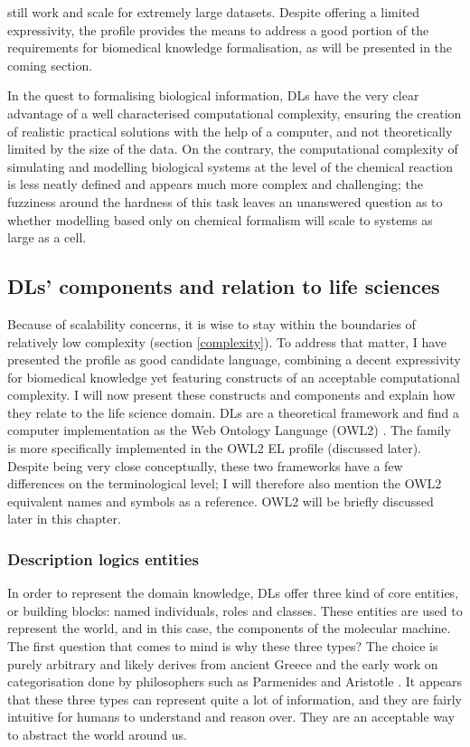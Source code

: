 still work and scale for extremely large datasets. Despite offering a limited expressivity, the  profile provides the means to address a good portion of the requirements for biomedical knowledge formalisation, as will be presented in the coming section.

In the quest to formalising biological information, DLs have the very clear advantage of a well characterised computational complexity, ensuring the creation of realistic practical solutions with the help of a computer, and not theoretically limited by the size of the data. On the contrary, the computational complexity of simulating and modelling biological systems at the level of the chemical reaction is less neatly defined \citep{meng2004modeling} \citep{gillespie2007stochastic} and appears much more complex and challenging; the fuzziness around the hardness of this task leaves an unanswered question as to whether modelling based only on chemical formalism will scale to systems as large as a cell.

\subsection{DLs' components and relation to life sciences}

Because of scalability concerns, it is wise to stay within the boundaries of relatively low complexity (section \ref{complexity}). To address that matter, I have presented the  profile as good candidate language, combining a decent expressivity for biomedical knowledge yet featuring constructs of an acceptable computational complexity. I will now present these constructs and components and explain how they relate to the life science domain. DLs are a theoretical framework and find a computer implementation as the Web Ontology Language (OWL2) \citep{owlw3c}. The  family is more specifically implemented in the OWL2 EL profile (discussed later).
Despite being very close conceptually, these two frameworks have a few differences on the terminological level; I will therefore also mention the OWL2 equivalent names and symbols as a reference. OWL2 will be briefly discussed later in this chapter.

\subsubsection{Description logics entities}
\label{coredl}

In order to represent the domain knowledge, DLs offer three kind of core entities, or building blocks: named individuals, roles and classes. These entities are used to represent the world, and in this case, the components of the molecular machine. The first question that comes to mind is why these three types? The choice is purely arbitrary and likely derives from ancient Greece and the early work on categorisation done by philosophers such as Parmenides and Aristotle \citep{ontologywiki}. It appears that these three types can represent quite a lot of information, and they are fairly intuitive for humans to understand and reason over. They are an acceptable way to abstract the world around us.

